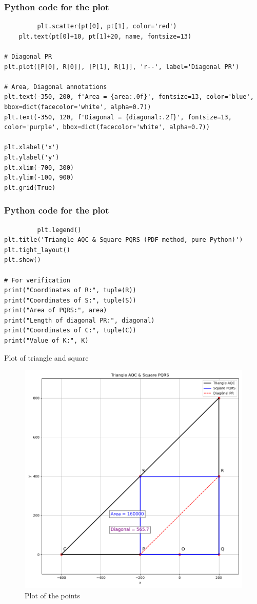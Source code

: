 \documentclass{beamer}
\begin{document}
 \begin{frame}[fragile]
   \frametitle{Python code for the plot}
     \begin{lstlisting}
         plt.scatter(pt[0], pt[1], color='red')
    plt.text(pt[0]+10, pt[1]+20, name, fontsize=13)

# Diagonal PR
plt.plot([P[0], R[0]], [P[1], R[1]], 'r--', label='Diagonal PR')

# Area, Diagonal annotations
plt.text(-350, 200, f'Area = {area:.0f}', fontsize=13, color='blue', bbox=dict(facecolor='white', alpha=0.7))
plt.text(-350, 120, f'Diagonal = {diagonal:.2f}', fontsize=13, color='purple', bbox=dict(facecolor='white', alpha=0.7))

plt.xlabel('x')
plt.ylabel('y')
plt.xlim(-700, 300)
plt.ylim(-100, 900)
plt.grid(True)

     \end{lstlisting}
 \end{frame}
 \begin{frame}[fragile]
      \frametitle{Python code for the plot}
     \begin{lstlisting}
         plt.legend()
plt.title('Triangle AQC & Square PQRS (PDF method, pure Python)')
plt.tight_layout()
plt.show()

# For verification
print("Coordinates of R:", tuple(R))
print("Coordinates of S:", tuple(S))
print("Area of PQRS:", area)
print("Length of diagonal PR:", diagonal)
print("Coordinates of C:", tuple(C))
print("Value of K:", K)
     \end{lstlisting}
 \end{frame}
     \begin{frame}{Plot of triangle and square}
       \begin{figure}
           \centering
           \includegraphics[width=0.7\linewidth]{figs/fig1.png}
           \caption{Plot of the points}
           \label{fig:placeholder}
       \end{figure}
         
     \end{frame}
\end{document}
